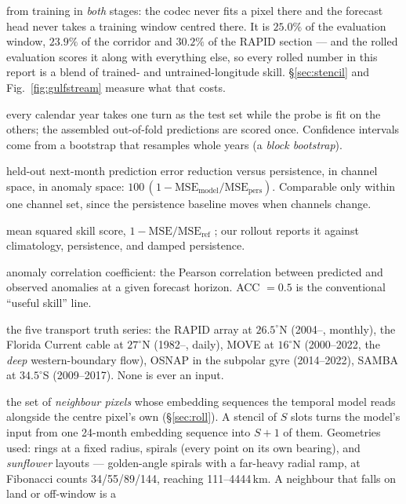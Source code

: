 \documentclass[10pt]{article}
\begin{document}
\begin{description}
  from training in \emph{both} stages: the codec never fits a pixel
  there and the forecast head never takes a training window centred
  there. It is $25.0\%$ of the evaluation window, $23.9\%$ of the
  corridor and $30.2\%$ of the RAPID section --- and the rolled
  evaluation scores it along with everything else, so every rolled
  number in this report is a blend of trained- and untrained-longitude
  skill. \S\ref{sec:stencil} and Fig.~\ref{fig:gulfstream} measure what
  that costs.
\item[k-fold (year-blocked)] every calendar year takes one turn as the
  test set while the probe is fit on the others; the assembled
  out-of-fold predictions are scored once. Confidence intervals come
  from a bootstrap that resamples whole years (a \emph{block
  bootstrap}).
\item[chan\%] held-out next-month prediction error reduction versus
  persistence, in channel space, in anomaly space:
  $100\,(1-\mathrm{MSE}_{\mathrm{model}}/\mathrm{MSE}_{\mathrm{pers}})$.
  Comparable only within one channel set, since the persistence
  baseline moves when channels change.
\item[MSSS] mean squared skill score, $1-\mathrm{MSE}/\mathrm{MSE}_{\mathrm{ref}}$
  \cite{goddard}; our rollout reports it against climatology,
  persistence, and damped persistence.
\item[ACC] anomaly correlation coefficient: the Pearson correlation
  between predicted and observed anomalies at a given forecast horizon.
  ACC $=0.5$ is the conventional ``useful skill'' line.
\item[RAPID / FC / MOVE / OSNAP / SAMBA] the five transport truth
  series: the RAPID array at $26.5^\circ$N (2004--, monthly), the
  Florida Current cable at $27^\circ$N (1982--, daily), MOVE at
  $16^\circ$N (2000--2022, the \emph{deep} western-boundary flow),
  OSNAP in the subpolar gyre (2014--2022), SAMBA at $34.5^\circ$S
  (2009--2017). None is ever an input.
\item[Stencil] the set of \emph{neighbour pixels} whose embedding
  sequences the temporal model reads alongside the centre pixel's own
  (\S\ref{sec:roll}). A stencil of $S$ slots turns the model's input
  from one 24-month embedding sequence into $S{+}1$ of them. Geometries
  used: rings at a fixed radius, spirals (every point on its own
  bearing), and \emph{sunflower} layouts --- golden-angle spirals with a
  far-heavy radial ramp, at Fibonacci counts 34/55/89/144, reaching
  111--4444\,km. A neighbour that falls on land or off-window is a

\end{description}
\end{document}
